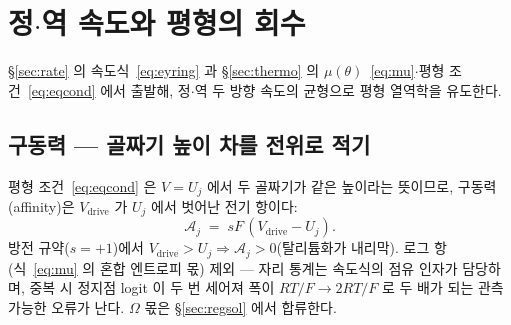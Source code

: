 \documentclass[11pt,a4paper]{article}
\newcommand{\drive}{\mathrm{drive}}
\begin{document}
\section{정$\cdot$역 속도와 평형의 회수}\label{sec:fwdrev}
\S\ref{sec:rate} 의 속도식~\eqref{eq:eyring} 과 \S\ref{sec:thermo} 의 $\mu(\theta)$~\eqref{eq:mu}$\cdot$평형 조건~\eqref{eq:eqcond} 에서 출발해, 정$\cdot$역 두 방향 속도의 균형으로 평형 열역학을 유도한다.

\subsection{구동력 — 골짜기 높이 차를 전위로 적기}
평형 조건~\eqref{eq:eqcond} 은 $V=U_j$ 에서 두 골짜기가 같은 높이라는 뜻이므로, 구동력(affinity)은 $V_\drive$ 가 $U_j$ 에서 벗어난 전기 항이다:
\begin{equation}
\mathcal A_j\;=\;sF\,(V_\drive-U_j).
\label{eq:affinity}
\end{equation}
방전 규약($s=+1$)에서 $V_\drive>U_j\Rightarrow\mathcal A_j>0$(탈리튬화가 내리막). 로그 항(식~\eqref{eq:mu} 의 혼합 엔트로피 몫) 제외 — 자리 통계는 속도식의 점유 인자가 담당하며, 중복 시 정지점 logit 이 두 번 세어져 폭이 $RT/F\to2RT/F$ 로 두 배가 되는 관측 가능한 오류가 난다. $\Omega$ 몫은 \S\ref{sec:regsol} 에서 합류한다.
\end{document}

